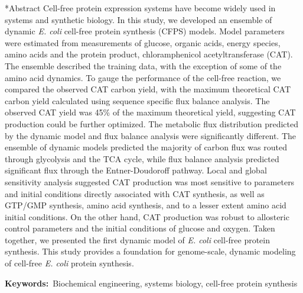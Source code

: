 \documentclass[12pt]{article}
\makeatletter
\renewcommand\section{\@startsection
	{subsection}{2}{0mm}
	{-0.2in}
	{0.05\baselineskip}
	{\normalfont\large\bfseries}}
\makeatother
\begin{document}
\section*{Abstract}
Cell-free protein expression systems have become widely used in systems and synthetic biology.
In this study, we developed an ensemble of dynamic \textit{E. coli} cell-free protein synthesis (CFPS) models.
Model parameters were estimated from measurements of glucose, organic acids, energy species, amino acids and the protein product, chloramphenicol acetyltransferase (CAT).
The ensemble described the training data, with the exception of some of the amino acid dynamics.
To gauge the performance of the cell-free reaction, we compared the observed CAT carbon yield, with the maximum theoretical CAT carbon yield calculated using sequence specific flux
balance analysis. The observed CAT yield was 45\% of the maximum theoretical yield, suggesting CAT production could be further optimized.
The metabolic flux distribution predicted by the dynamic model and flux balance analysis were significantly different.
The ensemble of dynamic models predicted the majority of carbon flux was routed through glycolysis and the TCA cycle,
while flux balance analysis predicted significant flux through the Entner-Doudoroff pathway.
Local and global sensitivity analysis suggested CAT production was most sensitive to parameters and initial conditions directly associated with CAT synthesis, as well as
GTP/GMP synthesis, amino acid synthesis, and to a lesser extent amino acid initial conditions.
On the other hand, CAT production was robust to allosteric control parameters and the initial conditions of glucose and oxygen.
Taken together, we presented the first dynamic model of \textit{E. coli} cell-free protein synthesis.
This study provides a foundation for genome-scale, dynamic modeling of cell-free \textit{E. coli} protein synthesis.

\vspace{0.1in}
{\noindent \textbf{Keywords:}~Biochemical engineering, systems biology, cell-free protein synthesis}

\pagebreak

\setcounter{page}{1}

\end{document}
